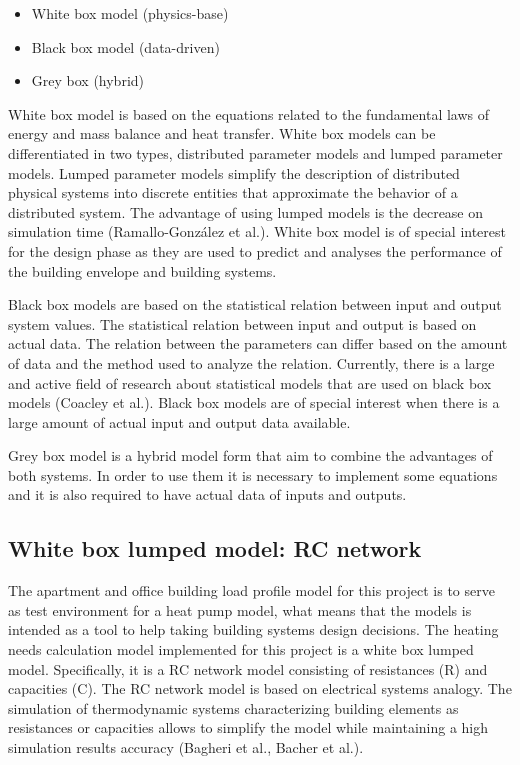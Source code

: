 \documentclass[a4paper,10pt]{article}
\begin{document}
\begin{itemize}
    \item White box model (physics-base) 
    \item Black box model (data-driven) 
    \item Grey box (hybrid) 

\end{itemize}
White box model is based on the equations related to the fundamental laws of energy and mass balance and heat transfer. White box models can be differentiated in two types, distributed parameter models and lumped parameter models. Lumped parameter models simplify the description of distributed physical systems into discrete entities that approximate the behavior of a distributed system. The advantage of using lumped models is the decrease on simulation time (Ramallo-González et al.). White box model is of special interest for the design phase as they are used to predict and analyses the performance of the building envelope and building systems.

Black box models are based on the statistical relation between input and output system values. The statistical relation between input and output is based on actual data. The relation between the parameters can differ based on the amount of data and the method used to analyze the relation. Currently, there is a large and active field of research about statistical models that are used on black box models (Coacley et al.). Black box models are of special interest when there is a large amount of actual input and output data available.   

Grey box model is a hybrid model form that aim to combine the advantages of both systems. In order to use them it is necessary to implement some equations and it is also required to have actual data of inputs and outputs. 

\subsection{White box lumped model: RC network} 

The apartment and office building load profile model for this project is to serve as test environment for a heat pump model, what means that the models is intended as a tool to help taking building systems design decisions. The heating needs calculation model implemented for this project is a white box lumped model. Specifically, it is a RC network model consisting of resistances (R) and capacities (C). The RC network model is based on electrical systems analogy. The simulation of thermodynamic systems characterizing building elements as resistances or capacities allows to simplify the model while maintaining a high simulation results accuracy (Bagheri et al., Bacher et al.).   
\end{document}
